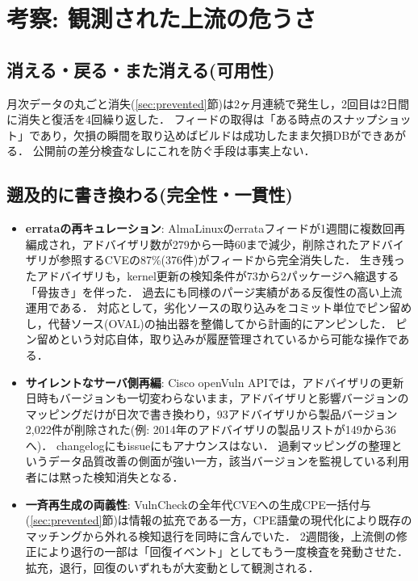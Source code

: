 \documentclass{css}
\begin{document}
\section{考察: 観測された上流の危うさ}
\label{sec:discussion}

\subsection{消える・戻る・また消える(可用性)}
\label{sec:avail}

月次データの丸ごと消失(\ref{sec:prevented}節)は2ヶ月連続で発生し，2回目は2日間に消失と復活を4回繰り返した．
フィードの取得は「ある時点のスナップショット」であり，欠損の瞬間を取り込めばビルドは成功したまま欠損DBができあがる．
公開前の差分検査なしにこれを防ぐ手段は事実上ない．

\subsection{遡及的に書き換わる(完全性・一貫性)}
\label{sec:integrity}

\begin{itemize}
\item \textbf{errataの再キュレーション}:
AlmaLinuxのerrataフィードが1週間に複数回再編成され，アドバイザリ数が279から一時60まで減少，削除されたアドバイザリが参照するCVEの87\%(376件)がフィードから完全消失した．
生き残ったアドバイザリも，kernel更新の検知条件が73から2パッケージへ縮退する「骨抜き」を伴った．
過去にも同様のパージ実績がある反復性の高い上流運用である．
対応として，劣化ソースの取り込みをコミット単位でピン留めし，代替ソース(OVAL)の抽出器を整備してから計画的にアンピンした．
ピン留めという対応自体，取り込みが履歴管理されているから可能な操作である．
\item \textbf{サイレントなサーバ側再編}:
Cisco openVuln APIでは，アドバイザリの更新日時もバージョンも一切変わらないまま，アドバイザリと影響バージョンのマッピングだけが日次で書き換わり，93アドバイザリから製品バージョン2,022件が削除された(例: 2014年のアドバイザリの製品リストが149から36へ)．
changelogにもissueにもアナウンスはない．
過剰マッピングの整理というデータ品質改善の側面が強い一方，該当バージョンを監視している利用者には黙った検知消失となる．
\item \textbf{一斉再生成の両義性}:
VulnCheckの全年代CVEへの生成CPE一括付与(\ref{sec:prevented}節)は情報の拡充である一方，CPE語彙の現代化により既存のマッチングから外れる検知退行を同時に含んでいた．
2週間後，上流側の修正により退行の一部は「回復イベント」としてもう一度検査を発動させた．
拡充，退行，回復のいずれもが大変動として観測される．
\end{itemize}
\end{document}
